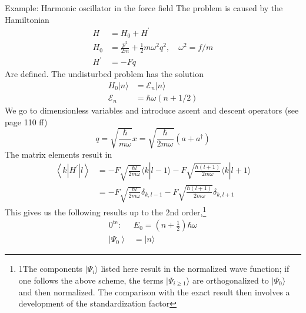 Example: Harmonic oscillator in the force field The problem is caused by the Hamiltonian
\begin{equation}
\begin{aligned} H &=H_{0}+H^{\prime} \\ H_{0} &=\frac{p^{2}}{2 m}+\frac{1}{2} m \omega^{2} q^{2}, \quad \omega^{2}=f / m \\ H^{\prime} &=-F q \end{aligned}
\end{equation}
Are defined. The undisturbed problem has the solution
\begin{equation}
\begin{aligned} H_{0}|n\rangle &=\mathcal{E}_{n}|n\rangle \\ \mathcal{E}_{n} &=\hbar \omega(n+1 / 2) \end{aligned}
\end{equation}
We go to dimensionless variables and introduce ascent and descent operators (see page 110 ff)
\begin{equation}
    q=\sqrt{\frac{\hbar}{m \omega}} x=\sqrt{\frac{\hbar}{2 m \omega}}\left(a+a^{\dagger}\right)
    \end{equation}
The matrix elements result in
\begin{equation}
\begin{aligned}\left\langle k\left|H^{\prime}\right| l\right\rangle &=- F \sqrt{\frac{\hbar l}{2 m \omega}}\langle k | l-1\rangle- F \sqrt{\frac{\hbar(l+1)}{2 m \omega}}\langle k | l+1\rangle \\ &=- F \sqrt{\frac{\hbar l}{2 m \omega}} \delta_{k, l-1}-F \sqrt{\frac{\hbar(l+1)}{2 m \omega}} \delta_{k, l+1} \end{aligned}
\end{equation}
This gives us the following results up to the 2nd order,\footnote{1The components $|\Psi_i\rangle$ listed here result in the normalized wave function; if one follows the above scheme, the terms $|\Psi_{i\geq 1}\rangle$ are orthogonalized to $|\Psi_0\rangle$ and then normalized. The comparison with the exact result then involves a development of the standardization factor}
\begin{equation}
\begin{array}{ll} 
0^{\mathrm{te}}: & E_{0}=\left(n+\frac{1}{2}\right)\hbar \omega \\
\left|\Psi_{0}\right\rangle &=|n\rangle \end{array}
\end{equation}

